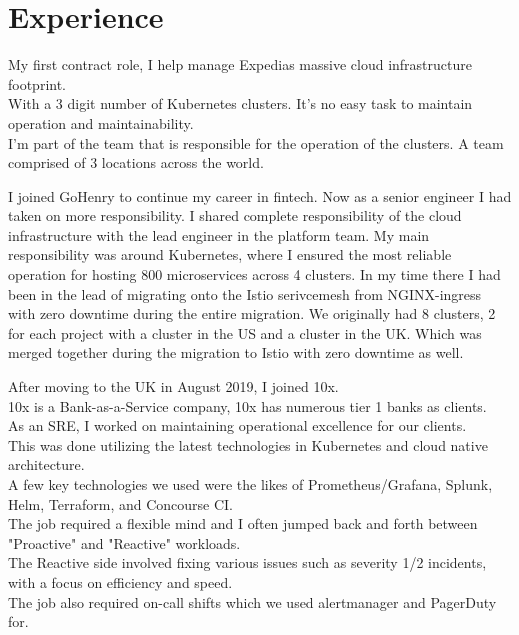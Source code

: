 \documentclass[]{cv}
\begin{document}
\begin{minipage}[t]{0.66\textwidth} 

\section{Experience}


My first contract role, I help manage Expedias massive cloud infrastructure footprint. \\
With a 3 digit number of Kubernetes clusters. It's no easy task to maintain operation and maintainability. \\
I'm part of the team that is responsible for the operation of the clusters. A team comprised of 3 locations across the world.
\sectionsep


I joined GoHenry to continue my career in fintech. 
Now as a senior engineer I had taken on more responsibility. 
I shared complete responsibility of the cloud infrastructure with the lead engineer in the
platform team. 
My main responsibility was around Kubernetes, where I ensured the most reliable operation for
hosting 800 microservices across 4 clusters. 
In my time there I had been in the lead of migrating onto the Istio serivcemesh from
NGINX-ingress with zero downtime during the entire migration. 
We originally had 8 clusters, 2 for each project with a cluster in the US and a cluster in the
UK. Which was merged together during the migration to Istio with zero downtime as well.
\sectionsep


After moving to the UK in August 2019, I joined 10x. \\
10x is a Bank-as-a-Service company, 10x has numerous tier 1 banks as clients. \\
As an SRE, I worked on maintaining operational excellence for our clients. \\
This was done utilizing the latest technologies in Kubernetes and cloud native architecture. \\
A few key technologies we used were the likes of Prometheus/Grafana, Splunk, Helm, Terraform, and Concourse CI. \\
The job required a flexible mind and I often jumped back and forth between "Proactive" and "Reactive" workloads. \\
The Reactive side involved fixing various issues such as severity 1/2 incidents, with a focus on efficiency and speed. \\
The job also required on-call shifts which we used alertmanager and PagerDuty for.
\sectionsep


\end{minipage}
\end{document}
